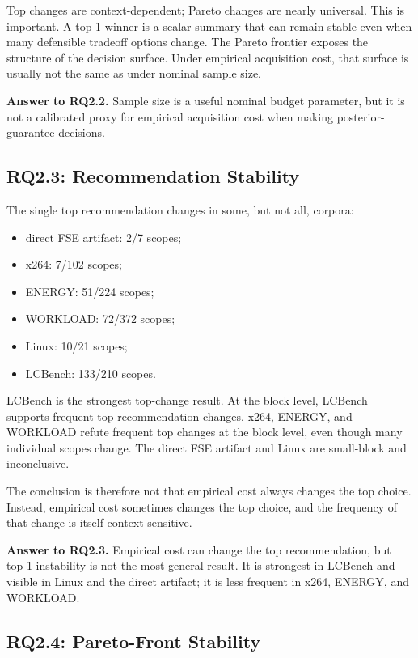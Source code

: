 \documentclass[smallcondensed]{svjour3}
\providecommand{\tightlist}{%
  \setlength{\itemsep}{0pt}\setlength{\parskip}{0pt}}
\begin{document}
Top changes are context-dependent; Pareto changes are nearly universal.
This is important. A top-1 winner is a scalar summary that can remain
stable even when many defensible tradeoff options change. The Pareto
frontier exposes the structure of the decision surface. Under empirical
acquisition cost, that surface is usually not the same as under nominal
sample size.

\textbf{Answer to RQ2.2.} Sample size is a useful nominal budget
parameter, but it is not a calibrated proxy for empirical acquisition
cost when making posterior-guarantee decisions.

\subsection{RQ2.3: Recommendation
Stability}\label{rq2.3-recommendation-stability}

The single top recommendation changes in some, but not all, corpora:

\begin{itemize}
\tightlist
\item
  direct FSE artifact: 2/7 scopes;
\item
  x264: 7/102 scopes;
\item
  ENERGY: 51/224 scopes;
\item
  WORKLOAD: 72/372 scopes;
\item
  Linux: 10/21 scopes;
\item
  LCBench: 133/210 scopes.
\end{itemize}

LCBench is the strongest top-change result. At the block level, LCBench
supports frequent top recommendation changes. x264, ENERGY, and WORKLOAD
refute frequent top changes at the block level, even though many
individual scopes change. The direct FSE artifact and Linux are
small-block and inconclusive.

The conclusion is therefore not that empirical cost always changes the
top choice. Instead, empirical cost sometimes changes the top choice,
and the frequency of that change is itself context-sensitive.

\textbf{Answer to RQ2.3.} Empirical cost can change the top
recommendation, but top-1 instability is not the most general result. It
is strongest in LCBench and visible in Linux and the direct artifact; it
is less frequent in x264, ENERGY, and WORKLOAD.

\subsection{RQ2.4: Pareto-Front
Stability}\label{rq2.4-pareto-front-stability}
\end{document}
